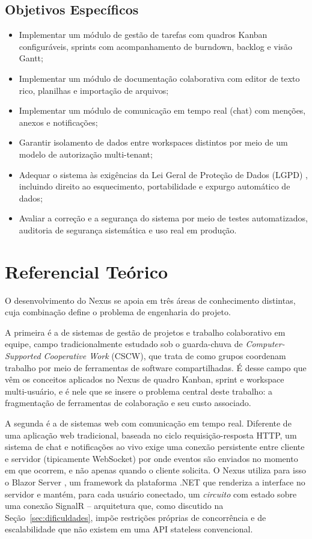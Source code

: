 \documentclass[12pt]{article}
\begin{document}
\subsection*{Objetivos Específicos}

\begin{itemize}
  \item Implementar um módulo de gestão de tarefas com quadros Kanban configuráveis, sprints com acompanhamento de burndown, backlog e visão Gantt;
  \item Implementar um módulo de documentação colaborativa com editor de texto rico, planilhas e importação de arquivos;
  \item Implementar um módulo de comunicação em tempo real (chat) com menções, anexos e notificações;
  \item Garantir isolamento de dados entre workspaces distintos por meio de um modelo de autorização multi-tenant;
  \item Adequar o sistema às exigências da Lei Geral de Proteção de Dados (LGPD) \cite{lgpd}, incluindo direito ao esquecimento, portabilidade e expurgo automático de dados;
  \item Avaliar a correção e a segurança do sistema por meio de testes automatizados, auditoria de segurança sistemática e uso real em produção.
\end{itemize}

\section{Referencial Teórico}

O desenvolvimento do Nexus se apoia em três áreas de conhecimento distintas, cuja combinação define o problema de engenharia do projeto.

A primeira é a de sistemas de gestão de projetos e trabalho colaborativo em equipe, campo tradicionalmente estudado sob o guarda-chuva de \emph{Computer-Supported Cooperative Work} (CSCW), que trata de como grupos coordenam trabalho por meio de ferramentas de software compartilhadas. É desse campo que vêm os conceitos aplicados no Nexus de quadro Kanban, sprint e workspace multi-usuário, e é nele que se insere o problema central deste trabalho: a fragmentação de ferramentas de colaboração e seu custo associado.

A segunda é a de sistemas web com comunicação em tempo real. Diferente de uma aplicação web tradicional, baseada no ciclo requisição-resposta HTTP, um sistema de chat e notificações ao vivo exige uma conexão persistente entre cliente e servidor (tipicamente WebSocket) por onde eventos são enviados no momento em que ocorrem, e não apenas quando o cliente solicita. O Nexus utiliza para isso o Blazor Server \cite{blazor}, um framework da plataforma .NET que renderiza a interface no servidor e mantém, para cada usuário conectado, um \emph{circuito} com estado sobre uma conexão SignalR -- arquitetura que, como discutido na Seção~\ref{sec:dificuldades}, impõe restrições próprias de concorrência e de escalabilidade que não existem em uma API stateless convencional.
\end{document}
